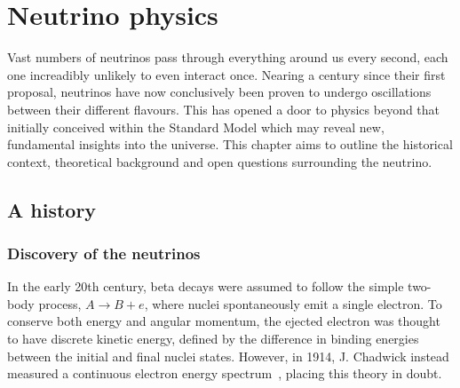 \chapter{Neutrino physics}
\label{chap:theory}


Vast numbers of neutrinos pass through everything around us every second, each one increadibly
unlikely to even interact once. Nearing a century since their first proposal, neutrinos have now
conclusively been proven to undergo oscillations between their different flavours. This has opened
a door to physics beyond that initially conceived within the Standard Model which may reveal new,
fundamental insights into the universe. This chapter aims to outline the historical context,
theoretical background and open questions surrounding the neutrino.

\section{A history}
\label{sec:theory_history}

\subsection{Discovery of the neutrinos} %
\label{sec:theory_history_neutrinos}

In the early 20th century, beta decays were assumed to follow the simple two-body process, $A
    \rightarrow B + e$, where nuclei spontaneously emit a single electron. To conserve both energy
and angular momentum, the ejected electron was thought to have discrete kinetic energy,
defined by the difference in binding energies between the initial and final nuclei states.
However, in 1914, J. Chadwick instead measured a continuous electron energy
spectrum~\cite{chadwick1914}, placing this theory in doubt.

